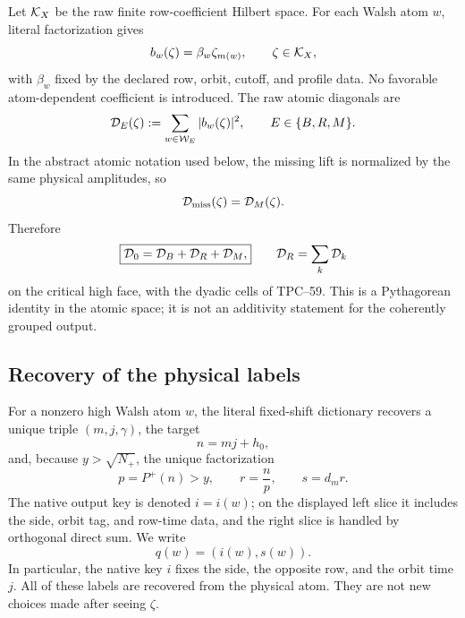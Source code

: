 Let \(\mathcal K_X\) be the raw finite row-coefficient Hilbert space.  For each
Walsh atom \(w\), literal factorization gives
\begin{equation}
 b_w(\zeta)=\beta_w\zeta_{m(w)},
 \qquad \zeta\in\mathcal K_X,
 \label{eq:tpc60-literal-atom-linear}
\end{equation}
with \(\beta_w\) fixed by the declared row, orbit, cutoff, and profile
data.  No favorable atom-dependent coefficient is introduced.  The raw
atomic diagonals are
\begin{equation}
 \mathcal D_E(\zeta):=\sum_{w\in\mathcal W_E}|b_w(\zeta)|^2,
 \qquad E\in\{B,R,M\}.
 \label{eq:tpc60-BRM-diagonals}
\end{equation}
In the abstract atomic notation used below, the missing lift is normalized
by the same physical amplitudes, so
\begin{equation}
 \mathcal D_{\rm miss}(\zeta)=\mathcal D_M(\zeta).
 \label{eq:tpc60-missing-diagonal-identification}
\end{equation}
Therefore
\begin{equation}
 \boxed{
 \mathcal D_0=\mathcal D_B+\mathcal D_R+\mathcal D_M,}
 \qquad
 \mathcal D_R=\sum_k\mathcal D_k
 \label{eq:tpc60-exact-raw-partition}
\end{equation}
on the critical high face, with the dyadic cells of TPC--59.  This is a
Pythagorean identity in the atomic space; it is not an additivity statement
for the coherently grouped output.

\subsection{Recovery of the physical labels}

For a nonzero high Walsh atom \(w\), the literal fixed-shift dictionary
recovers a unique triple \((m,j,\gamma)\), the target
\begin{equation}
 n=mj+h_0,
 \label{eq:tpc60-target-n}
\end{equation}
and, because \(y>\sqrt{N_+}\), the unique factorization
\begin{equation}
 p=P^+(n)>y,
 \qquad r=\frac np,
 \qquad s=d_mr.
 \label{eq:tpc60-prs-recovery}
\end{equation}
The native output key is denoted \(i=i(w)\); on the displayed left slice
it includes the side, orbit tag, and row-time data, and the right slice is
handled by orthogonal direct sum.  We write
\begin{equation}
 q(w)=(i(w),s(w)).
 \label{eq:tpc60-residual-key}
\end{equation}
In particular, the native key \(i\) fixes the side, the opposite row, and
the orbit time \(j\).  All of these labels are recovered from the physical
atom.  They are not
new choices made after seeing \(\zeta\).

